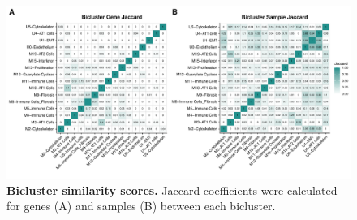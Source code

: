 \documentclass[
]{article}
\begin{document}
\begin{figure}
\includegraphics[width=1\linewidth,]{./Figures/SysReview/FigE9_biclusterjaccard} \caption[Bicluster similarity matrix]{\textbf{Bicluster similarity scores.} Jaccard coefficients were calculated for genes (A) and samples (B) between each bicluster.}\label{fig:biclusterjaccard}
\end{figure}
\end{document}
